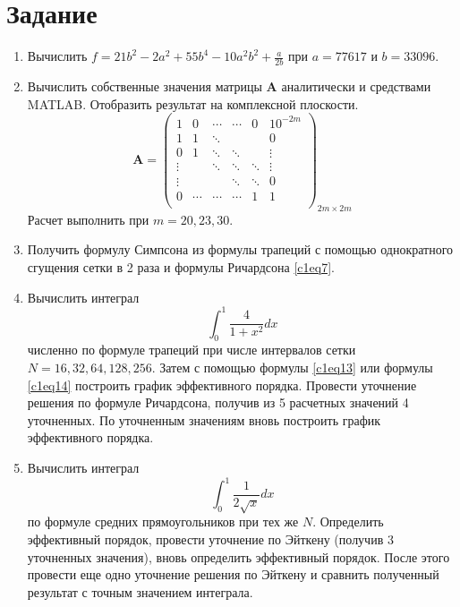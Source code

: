\section{Задание}
\begin{enumerate}
\item Вычислить $\displaystyle f = 21b^2 - 2a^2 + 55b^4 - 10a^2b^2 + \frac{a}{2b}$ при $a = 77617$ и $b = 33096$.
\item Вычислить собственные значения матрицы $\mathbf{A}$ аналитически и средствами MATLAB. Отобразить результат на комплексной плоскости.
\begin{equation} \nonumber
	\mathbf{A} = 
	\begin{pmatrix}
		1 & 0 & \cdots & \cdots & 0 & 10^{-2m} \\
		1 & 1 & \ddots &  &  & 0 \\
		0 & 1 & \ddots &  \ddots &  & \vdots \\
		\vdots &  & \ddots & \ddots & \ddots & \vdots \\
		\vdots &  &  & \ddots & \ddots & 0 \\
		0 & \cdots & \cdots &  \cdots & 1 & 1 \\
	\end{pmatrix}_{2m \times 2m}
\end{equation}
Расчет выполнить при $m = 20,23,30$.
\item Получить формулу Симпсона из формулы трапеций с помощью однократного сгущения сетки в 2 раза и формулы Ричардсона \eqref{c1eq7}.
\item Вычислить интеграл 
\begin{equation} \nonumber
	\int_{0}^{1} \frac{4}{1 + x^2} dx
\end{equation}
численно по формуле трапеций при числе интервалов сетки $N = 16,32,64,128,256$. Затем с помощью формулы \eqref{c1eq13} или формулы \eqref{c1eq14} построить график эффективного порядка. Провести уточнение решения по формуле Ричардсона, получив из 5 расчетных значений 4 уточненных. По уточненным значениям вновь построить график эффективного порядка.
\item Вычислить интеграл 
\begin{equation} \nonumber
	\int_{0}^{1} \frac{1}{2 \sqrt{x}} dx
\end{equation}
по формуле средних прямоугольников при тех же $N$. Определить эффективный порядок, провести уточнение по Эйткену (получив 3 уточненных значения), вновь определить эффективный порядок. После этого провести еще одно уточнение решения по Эйткену и сравнить полученный результат с точным значением интеграла.
\end {enumerate}